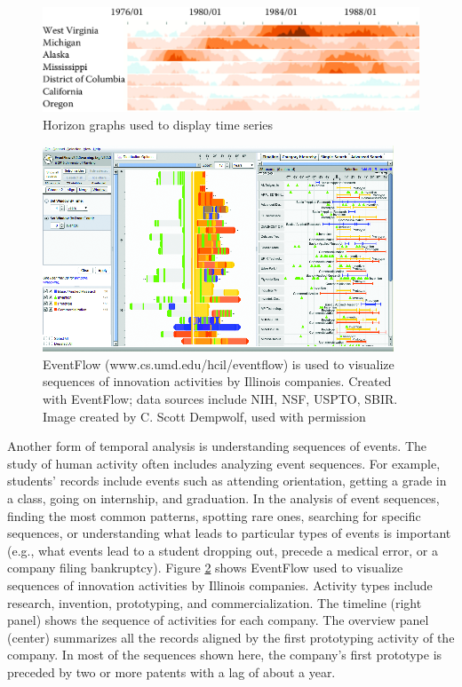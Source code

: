 \documentclass[]{krantz}
\begin{document}
\begin{figure}

{\centering \includegraphics[width=0.7\linewidth]{ChapterViz/figures/fig9-6} 

}

\caption{Horizon graphs used to display time series}\label{fig:fig9-6}
\end{figure}

\begin{figure}

{\centering \includegraphics[width=0.7\linewidth]{ChapterViz/figures/fig9-7} 

}

\caption{EventFlow (www.cs.umd.edu/hcil/eventflow) is used to visualize sequences of innovation activities by Illinois companies. Created with EventFlow; data sources include NIH, NSF, USPTO, SBIR. Image created by C. Scott Dempwolf, used with permission}\label{fig:fig9-7}
\end{figure}

Another form of temporal analysis is understanding sequences of events.
The study of human activity often includes analyzing event sequences.
For example, students' records include events such as attending
orientation, getting a grade in a class, going on internship, and
graduation. In the analysis of event sequences, finding the most common
patterns, spotting rare ones, searching for specific sequences, or
understanding what leads to particular types of events is important
(e.g., what events lead to a student dropping out, precede a medical
error, or a company filing bankruptcy). Figure \ref{fig:fig9-7} shows
EventFlow used to visualize sequences of innovation activities by
Illinois companies. Activity types include research, invention,
prototyping, and commercialization. The timeline (right panel) shows the
sequence of activities for each company. The overview panel (center)
summarizes all the records aligned by the first prototyping activity of
the company. In most of the sequences shown here, the company's first
prototype is preceded by two or more patents with a lag of about a year.
\end{document}
